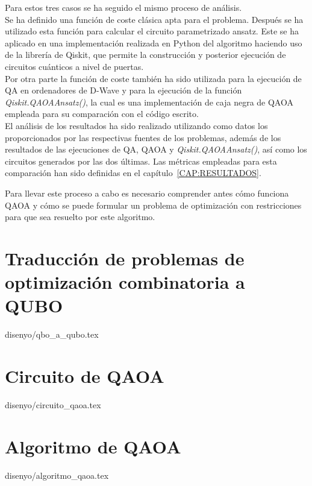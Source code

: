 Para estos tres casos se ha seguido el mismo proceso de análisis.
\\
Se ha definido una función de coste clásica apta para el problema.
Después se ha utilizado esta función para calcular el circuito parametrizado ansatz.
Este se ha aplicado en una implementación realizada en Python del algoritmo haciendo uso de la librería de Qiskit, que permite la construcción y posterior ejecución de circuitos cuánticos a nivel de puertas.
\\
Por otra parte la función de coste también ha sido utilizada para la ejecución de QA en ordenadores de D-Wave y para la ejecución de la función \textit{Qiskit.QAOAAnsatz()}, la cual es una implementación de caja negra de QAOA empleada para su comparación con el código escrito.
\\
El análisis de los resultados ha sido realizado utilizando como datos los proporcionados por las respectivas fuentes de los problemas, además de los resultados de las ejecuciones de QA, QAOA y \textit{Qiskit.QAOAAnsatz()}, así como los circuitos generados por las dos últimas.
Las métricas empleadas para esta comparación han sido definidas en el capítulo~\ref{CAP:RESULTADOS}.

Para llevar este proceso a cabo es necesario comprender antes cómo funciona QAOA y cómo se puede formular un problema de optimización con restricciones para que sea resuelto por este algoritmo.

\section{Traducción de problemas de optimización combinatoria a QUBO\label{sec:3-problemas de optimizacion combinatoria}}{disenyo/qbo_a_qubo.tex}

\section{Circuito de QAOA\label{sec:3-circuito de qaoa}}{disenyo/circuito_qaoa.tex}

\section{Algoritmo de QAOA}{disenyo/algoritmo_qaoa.tex}


